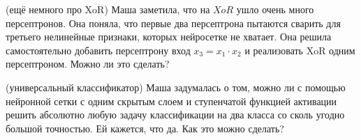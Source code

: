 \documentclass[12pt, a4paper, oneside]{article}
\theoremstyle{plain} %
\theoremstyle{definition}
\begin{document}
\begin{problem}{(ещё немного про XoR)} 
	Маша заметила, что на $XoR$ ушло очень много персептронов. Она поняла, что первые два персептрона пытаются сварить для третьего нелинейные признаки, которых нейросетке не хватает. Она решила самостоятельно добавить персептрону вход $x_3 = x_1 \cdot x_2$ и реализовать XoR одним персептроном. Можно ли это сделать? 
\end{problem}

\newpage 

\begin{problem}{(универсальный классификатор)}
	Маша задумалась о том, можно ли с помощью нейронной сетки с одним скрытым слоем и ступенчатой функцией активации решить абсолютно любую задачу классификации на два класса со сколь угодно большой точностью. Ей кажется, что да. Как это можно сделать? 
\end{problem} 
\end{document}
